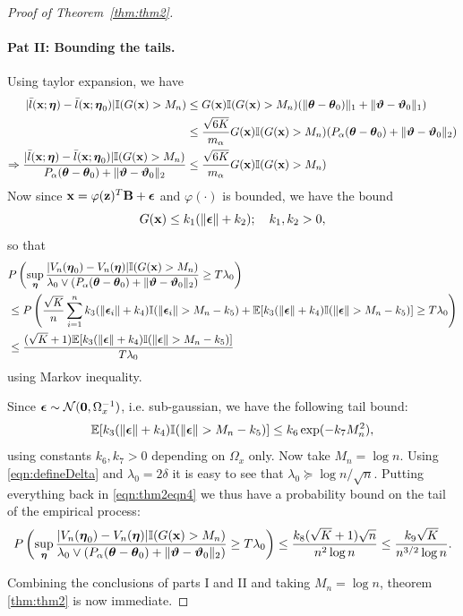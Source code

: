 \documentclass[11pt,letterpaper]{article}
\numberwithin{equation}{section}
\begin{document}
\begin{proof}[Proof of Theorem~\ref{thm:thm2}]
\paragraph{Pat II: Bounding the tails.} Using taylor expansion, we have
%
\begin{align*}
| \bar l({\bf{x}}; {\boldsymbol{\eta}}) -  \bar l({\bf{x}}; {\boldsymbol{\eta}}_0)| {\mathbb{I}}(G({\bf{x}}) > M_n) & \leq
G({\bf{x}}) {\mathbb{I}}(G({\bf{x}}) > M_n) (\| {\boldsymbol{\theta}} - {\boldsymbol{\theta}}_0)\|_1 + \| {\boldsymbol{\vartheta}} - {\boldsymbol{\vartheta}}_0 \|_1) \\
& \leq \frac{\sqrt{6K}}{m_\alpha} G({\bf{x}}) {\mathbb{I}}(G({\bf{x}}) > M_n) ( P_\alpha( {\boldsymbol{\theta}} - {\boldsymbol{\theta}}_0) + \| {\boldsymbol{\vartheta}} - {\boldsymbol{\vartheta}}_0 \|_2) \\
\Rightarrow \frac{| \bar l({\bf{x}}; {\boldsymbol{\eta}}) -  \bar l({\bf{x}}; {\boldsymbol{\eta}}_0)| {\mathbb{I}}(G({\bf{x}}) > M_n)}
{P_\alpha( {\boldsymbol{\theta}} - {\boldsymbol{\theta}}_0) + \| {\boldsymbol{\vartheta}} - {\boldsymbol{\vartheta}}_0 \|_2}
& \leq \frac{\sqrt{6K}}{m_\alpha} G({\bf{x}}) {\mathbb{I}}(G({\bf{x}}) > M_n)
\end{align*}
%
Now since ${\bf{x}} = \varphi({\bf{z}})^T {\mathbf{B}} + {\boldsymbol{\epsilon}}$ and $\varphi(\cdot)$ is bounded, we have the bound
%
$$
G({\bf{x}}) \leq k_1 ( \| {\boldsymbol{\epsilon}} \| + k_2 ); \quad k_1, k_2 > 0,
$$
%
so that
%
\begin{align}
& P \left( \sup_{\boldsymbol{\eta}} \frac{ |V_n({\boldsymbol{\eta}}_0) - V_n({\boldsymbol{\eta}})| {\mathbb{I}}(G({\bf{x}}) > M_n)}{\lambda_0 \vee
(P_\alpha({\boldsymbol{\theta}} - {\boldsymbol{\theta}}_0) + \| {\boldsymbol{\vartheta}} - {\boldsymbol{\vartheta}}_0 \|_2) } \geq T \lambda_0 \right) \notag\\
& \leq P \left( \frac{\sqrt K}{n} \sum_{i=1}^n k_3 (\| {\boldsymbol{\epsilon}}_i \| + k_4) {\mathbb{I}}(\| {\boldsymbol{\epsilon}}_i \| > M_n - k_5)
+ {\mathbb{E}} [ k_3 (\| {\boldsymbol{\epsilon}} \| + k_4) {\mathbb{I}}(\| {\boldsymbol{\epsilon}} \| > M_n - k_5) ] \geq T \lambda_0 \right) \notag\\
& \leq \frac{(\sqrt K + 1) {\mathbb{E}}[ k_3 (\| {\boldsymbol{\epsilon}} \| + k_4) {\mathbb{I}}(\| {\boldsymbol{\epsilon}} \| > M_n - k_5) ]}{T \lambda_0}
\label{eqn:thm2eqn4}
\end{align}
%
using Markov inequality.

Since ${\boldsymbol{\epsilon}} \sim {\cal{N}}({\bf 0}, \Omega_x^{-1})$, i.e. sub-gaussian, we have the following tail bound:
%
$$
{\mathbb{E}}[ k_3 (\| {\boldsymbol{\epsilon}} \| + k_4) {\mathbb{I}}(\| {\boldsymbol{\epsilon}} \| > M_n - k_5) ] \leq k_6 \exp(- k_7 M_n^2),
$$
%
using constants $k_6, k_7 > 0$ depending on $\Omega_x$ only. Now take $M_n = \log n$. Using \eqref{eqn:defineDelta} and $\lambda_0 = 2 \delta$ it is easy to see that $\lambda_0 \succeq \log n/ \sqrt n$.  Putting everything back in \eqref{eqn:thm2eqn4} we thus have a probability bound on the tail of the empirical process:
%
$$
P \left( \sup_{\boldsymbol{\eta}} \frac{ |V_n({\boldsymbol{\eta}}_0) - V_n({\boldsymbol{\eta}})| {\mathbb{I}}(G({\bf{x}}) > M_n)}{\lambda_0 \vee
(P_\alpha({\boldsymbol{\theta}} - {\boldsymbol{\theta}}_0) + \| {\boldsymbol{\vartheta}} - {\boldsymbol{\vartheta}}_0 \|_2) } \geq T \lambda_0 \right) \leq
\frac{k_8 (\sqrt K + 1) \sqrt n}{n^2 \log n} \leq \frac{k_9 \sqrt K}{n^{3/2} \log n}.
$$

Combining the conclusions of parts I and II and taking $M_n = \log n$, theorem \ref{thm:thm2} is now immediate.
\end{proof}
%





\end{document}
